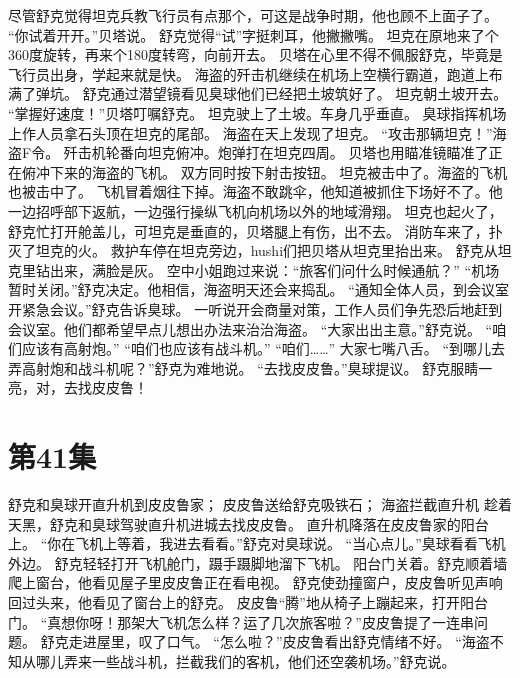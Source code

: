 \documentclass[a4paper,12pt,UTF8,twoside]{ctexbook}
\begin{document}
        尽管舒克觉得坦克兵教飞行员有点那个，可这是战争时期，他也顾不上面子了。 
        “你试着开开。”贝塔说。 
        舒克觉得“试”字挺刺耳，他撇撇嘴。 
        坦克在原地来了个360度旋转，再来个180度转弯，向前开去。 
        贝塔在心里不得不佩服舒克，毕竟是飞行员出身，学起来就是快。 
        海盗的歼击机继续在机场上空横行霸道，跑道上布满了弹坑。 
        舒克通过潜望镜看见臭球他们已经把土坡筑好了。 
        坦克朝土坡开去。 
        “掌握好速度！”贝塔叮嘱舒克。 
        坦克驶上了土坡。车身几乎垂直。 
        臭球指挥机场上作人员拿石头顶在坦克的尾部。 
        海盗在天上发现了坦克。 
        “攻击那辆坦克！”海盗F令。 
        歼击机轮番向坦克俯冲。炮弹打在坦克四周。 
        贝塔也用瞄准镜瞄准了正在俯冲下来的海盗的飞机。 
        双方同时按下射击按钮。 
        坦克被击中了。海盗的飞机也被击中了。 
        飞机冒着烟往下掉。海盗不敢跳伞，他知道被抓住下场好不了。他一边招呼部下返航，一边强行操纵飞机向机场以外的地域滑翔。 
        坦克也起火了，舒克忙打开舱盖儿，可坦克是垂直的，贝塔腿上有伤，出不去。 
        消防车来了，扑灭了坦克的火。 
        救护车停在坦克旁边，hushi们把贝塔从坦克里抬出来。 
        舒克从坦克里钻出来，满脸是灰。 
        空中小姐跑过来说：“旅客们问什么时候通航？” 
        “机场暂时关闭。”舒克决定。他相信，海盗明天还会来捣乱。 
        “通知全体人员，到会议室开紧急会议。”舒克告诉臭球。 
        一听说开会商量对策，工作人员们争先恐后地赶到会议室。他们都希望早点儿想出办法来治治海盗。 
        “大家出出主意。”舒克说。 
        “咱们应该有高射炮。” 
        “咱们也应该有战斗机。” 
        “咱们……” 
        大家七嘴八舌。 
        “到哪儿去弄高射炮和战斗机呢？”舒克为难地说。 
        “去找皮皮鲁。”臭球提议。 
        舒克服睛一亮，对，去找皮皮鲁！   \chapter{第41集} 
        舒克和臭球开直升机到皮皮鲁家； 
        皮皮鲁送给舒克吸铁石； 
        海盗拦截直升机   
        趁着天黑，舒克和臭球驾驶直升机进城去找皮皮鲁。 
        直升机降落在皮皮鲁家的阳台上。 
        “你在飞机上等着，我进去看看。”舒克对臭球说。 
        “当心点儿。”臭球看看飞机外边。 
        舒克轻轻打开飞机舱门，蹑手蹑脚地溜下飞机。 
        阳台门关着。舒克顺着墙爬上窗台，他看见屋子里皮皮鲁正在看电视。 
        舒克使劲撞窗户，皮皮鲁听见声响回过头来，他看见了窗台上的舒克。 
        皮皮鲁“腾”地从椅子上蹦起来，打开阳台门。 
        “真想你呀！那架大飞机怎么样？运了几次旅客啦？”皮皮鲁提了一连串问题。 
        舒克走进屋里，叹了口气。 
        “怎么啦？”皮皮鲁看出舒克情绪不好。 
        “海盗不知从哪儿弄来一些战斗机，拦截我们的客机，他们还空袭机场。”舒克说。 
\end{document}
